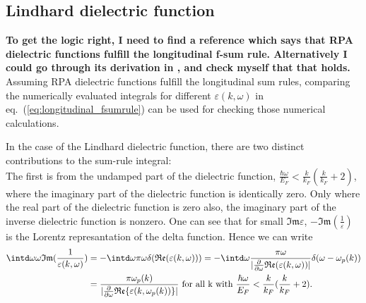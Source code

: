 \documentclass[physics,phd,nolot,nolof]{uccthesis}%
\newcommand{\alert}[1]{\textbf{\color{red}#1}}
\begin{document}
{\subsection{Lindhard dielectric function}
\alert{To get the logic right, I need to find a reference which says that RPA dielectric functions fulfill the longitudinal f-sum rule.
Alternatively I could go through its derivation in \cite{mahanmany}, and check myself that that holds.}
Assuming RPA dielectric functions fulfill the longitudinal sum rules, 
comparing the numerically evaluated integrals for different $\varepsilon(k,\omega)$ in eq.~(\ref{eq:longitudinal_fsumrule}) can be used for checking those numerical calculations. 

In the case of the Lindhard dielectric function, there are two distinct contributions to the sum-rule integral:\\
The first is from the undamped part of the dielectric function, 
$\frac{\hbar\omega}{E_F}<\frac{k}{k_F}(\frac{k}{k_F}+2)$,
where the imaginary part of the dielectric function is identically zero.
Only where the real part of the dielectric function is zero also, the imaginary part of the inverse dielectric function is nonzero. 
One can see that for small $\mathfrak{Im}\varepsilon$, 
$-\mathfrak{Im}(\frac{1}{\varepsilon})$ is the Lorentz represantation of the delta function.
Hence we can write
\begin{equation}
  \begin{split}
    \intd\omega%
  \omega \mathfrak{Im}(\frac{1}{\varepsilon(k,\omega)})
&  = -\intd\omega%
  \pi \omega \delta(\mathfrak{Re}(\varepsilon(k,\omega))) 
  = -\intd\omega%
  \frac{\pi \omega}{ |\frac{\partial}{\partial \omega}\mathfrak{Re}(\varepsilon(k,\omega))|}\delta(\omega-\omega_p(k))\\ 
  & =\frac{\pi \omega_p(k)}{| \frac{\partial}{\partial \omega}\mathfrak{Re}\{\varepsilon(k,\omega_p(k))\}|}
 \text{ for all k with }
\frac{\hbar\omega}{E_F}<\frac{k}{k_F}(\frac{k}{k_F}+2).
  \end{split}
  \label{eq:fsumrule_lindhard_undamped}
\end{equation}

}
\end{document}
